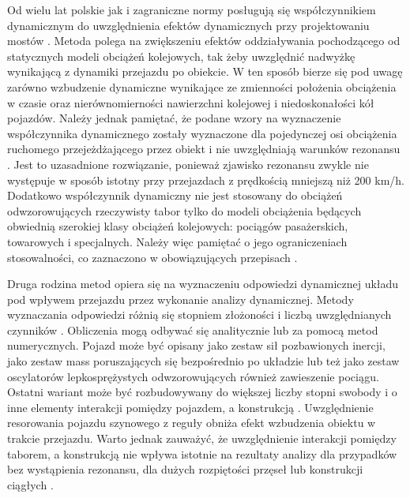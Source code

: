 Od wielu lat polskie jak i zagraniczne normy posługują się współczynnikiem dynamicznym do uwzględnienia efektów dynamicznych przy projektowaniu mostów \parencite{Karas2011a}. Metoda polega na zwiększeniu efektów oddziaływania pochodzącego od statycznych modeli obciążeń kolejowych, tak żeby uwzględnić nadwyżkę wynikającą z dynamiki przejazdu po obiekcie. W ten sposób bierze się pod uwagę zarówno wzbudzenie dynamiczne wynikające ze zmienności położenia obciążenia w czasie oraz nierównomierności nawierzchni kolejowej i niedoskonałości kół pojazdów. Należy jednak pamiętać, że podane wzory na wyznaczenie współczynnika dynamicznego zostały wyznaczone dla pojedynczej osi obciążenia ruchomego przejeżdżającego przez obiekt i nie uwzględniają warunków rezonansu \parencite{Goicolea2008}. Jest to uzasadnione rozwiązanie, ponieważ zjawisko rezonansu zwykle nie występuje w sposób istotny przy przejazdach z prędkością mniejszą niż 200 km/h. Dodatkowo współczynnik dynamiczny nie jest stosowany do obciążeń odwzorowujących rzeczywisty tabor tylko do modeli obciążenia będących obwiednią szerokiej klasy obciążeń kolejowych: pociągów pasażerskich, towarowych i specjalnych. Należy więc pamiętać o jego ograniczeniach stosowalności, co zaznaczono w obowiązujących przepisach \parencite{PKNj}. 

Druga rodzina metod opiera się na wyznaczeniu odpowiedzi dynamicznej układu pod wpływem przejazdu przez wykonanie analizy dynamicznej. Metody wyznaczania odpowiedzi różnią się stopniem złożoności i liczbą uwzględnianych czynników \parencite{Goicolea2008a}. Obliczenia mogą odbywać się analitycznie lub za pomocą metod numerycznych. Pojazd może być opisany jako zestaw sił pozbawionych inercji, jako zestaw mass poruszających się bezpośrednio po układzie lub też jako zestaw oscylatorów lepkosprężystych odwzorowujących również zawieszenie pociągu. Ostatni wariant może być rozbudowywany do większej liczby stopni swobody i o inne elementy interakcji pomiędzy pojazdem, a konstrukcją \parencite{Calcada2008,Szafranski2013,Szafranski2021}. Uwzględnienie resorowania pojazdu szynowego z reguły obniża efekt wzbudzenia obiektu w trakcie przejazdu. Warto jednak zauważyć, że uwzględnienie interakcji pomiędzy taborem, a konstrukcją nie wpływa istotnie na rezultaty analizy dla przypadków bez wystąpienia rezonansu, dla dużych rozpiętości przęseł lub konstrukcji ciągłych \parencite{Goicolea2008a}.

